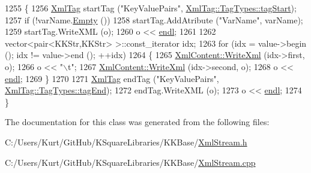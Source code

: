 \begin{DoxyCode}
1255 \{
1256   \hyperlink{class_k_k_b_1_1_xml_tag}{XmlTag}  startTag (\textcolor{stringliteral}{"KeyValuePairs"},  \hyperlink{class_k_k_b_1_1_xml_tag_a6c0ef0e23f982f49d55d4fb7eaff6ac9ab02b23b5e15b3a1353771313e1176ce0}{XmlTag::TagTypes::tagStart});
1257   \textcolor{keywordflow}{if}  (!varName.\hyperlink{class_k_k_b_1_1_k_k_str_ac69942f73fffd672ec2a6e1c410afdb6}{Empty} ())
1258     startTag.AddAtribute (\textcolor{stringliteral}{"VarName"}, varName);
1259   startTag.WriteXML (o);
1260   o << \hyperlink{namespace_k_k_b_ad1f50f65af6adc8fa9e6f62d007818a8}{endl};
1261 
1262   vector<pair<KKStr,KKStr> >::const\_iterator  idx;
1263   \textcolor{keywordflow}{for}  (idx = value->begin ();  idx != value->end ();  ++idx)
1264   \{
1265     \hyperlink{class_k_k_b_1_1_xml_content_ab0e370562d215b8e19dac6d18c4a95e1}{XmlContent::WriteXml} (idx->first,  o);
1266     o << \textcolor{stringliteral}{"\(\backslash\)t"};
1267     \hyperlink{class_k_k_b_1_1_xml_content_ab0e370562d215b8e19dac6d18c4a95e1}{XmlContent::WriteXml} (idx->second, o);
1268     o << \hyperlink{namespace_k_k_b_ad1f50f65af6adc8fa9e6f62d007818a8}{endl};
1269   \}
1270 
1271   \hyperlink{class_k_k_b_1_1_xml_tag}{XmlTag}  endTag (\textcolor{stringliteral}{"KeyValuePairs"}, \hyperlink{class_k_k_b_1_1_xml_tag_a6c0ef0e23f982f49d55d4fb7eaff6ac9a3ceaa9a790f688ec97a35b5a3fd3b164}{XmlTag::TagTypes::tagEnd});
1272   endTag.WriteXML (o);
1273   o << \hyperlink{namespace_k_k_b_ad1f50f65af6adc8fa9e6f62d007818a8}{endl};
1274 \}
\end{DoxyCode}


The documentation for this class was generated from the following files\+:\begin{DoxyCompactItemize}
\item 
C\+:/\+Users/\+Kurt/\+Git\+Hub/\+K\+Square\+Libraries/\+K\+K\+Base/\hyperlink{_xml_stream_8h}{Xml\+Stream.\+h}\item 
C\+:/\+Users/\+Kurt/\+Git\+Hub/\+K\+Square\+Libraries/\+K\+K\+Base/\hyperlink{_xml_stream_8cpp}{Xml\+Stream.\+cpp}\end{DoxyCompactItemize}
